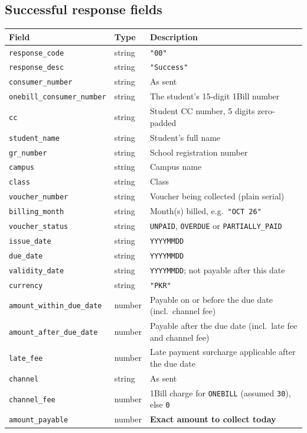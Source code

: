 \documentclass[11pt]{article}
\begin{document}
\subsection{Successful response fields}
\begin{longtable}{@{}p{} p{} p{}@{}}
\toprule
\textbf{Field} & \textbf{Type} & \textbf{Description} \\
\midrule
\endhead
\texttt{response\_code} & string & \texttt{"00"} \\
\texttt{response\_desc} & string & \texttt{"Success"} \\
\texttt{consumer\_number} & string & As sent \\
\texttt{onebill\_consumer\_number} & string & The student's 15-digit 1Bill number \\
\texttt{cc} & string & Student CC number, 5 digits zero-padded \\
\texttt{student\_name} & string & Student's full name \\
\texttt{gr\_number} & string & School registration number \\
\texttt{campus} & string & Campus name \\
\texttt{class} & string & Class \\
\texttt{voucher\_number} & string & Voucher being collected (plain serial) \\
\texttt{billing\_month} & string & Month(s) billed, e.g.\ \texttt{"OCT 26"} \\
\texttt{voucher\_status} & string & \texttt{UNPAID}, \texttt{OVERDUE} or \texttt{PARTIALLY\_PAID} \\
\texttt{issue\_date} & string & \texttt{YYYYMMDD} \\
\texttt{due\_date} & string & \texttt{YYYYMMDD} \\
\texttt{validity\_date} & string & \texttt{YYYYMMDD}; not payable after this date \\
\texttt{currency} & string & \texttt{"PKR"} \\
\texttt{amount\_within\_due\_date} & number & Payable on or before the due date (incl.\ channel fee) \\
\texttt{amount\_after\_due\_date} & number & Payable after the due date (incl.\ late fee and channel fee) \\
\texttt{late\_fee} & number & Late payment surcharge applicable after the due date \\
\texttt{channel} & string & As sent \\
\texttt{channel\_fee} & number & 1Bill charge for \texttt{ONEBILL} (assumed \texttt{30}), else \texttt{0} \\
\texttt{amount\_payable} & number & \textbf{Exact amount to collect today} \\
\bottomrule
\end{longtable}
\end{document}
